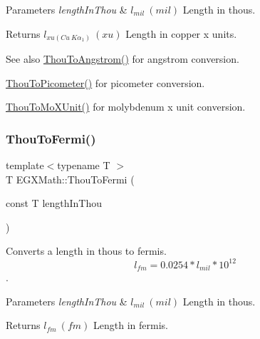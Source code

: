 \begin{DoxyParams}{Parameters}
{\em length\+In\+Thou} & $ l_{mil}\ (mil)$ Length in thous. \\
\hline
\end{DoxyParams}
\begin{DoxyReturn}{Returns}
$ l_{xu(Cu\ K\alpha_1)}\ (xu)$ Length in copper x units. 
\end{DoxyReturn}
\begin{DoxySeeAlso}{See also}
\mbox{\hyperlink{group___e_g_x_math-_conversions-_length_conversions-_imperial-_thou-_non-_s_i_ga5d852bdec8556e4b6bde1445f5f74a20}{Thou\+To\+Angstrom()}} for angstrom conversion. 

\mbox{\hyperlink{group___e_g_x_math-_conversions-_length_conversions-_imperial-_thou-_s_i_gabc7a92b07f617bdf0ac0249d34c4aa4c}{Thou\+To\+Picometer()}} for picometer conversion. 

\mbox{\hyperlink{group___e_g_x_math-_conversions-_length_conversions-_imperial-_thou-_non-_s_i_ga3eb765800fa51e529878bdae4e997763}{Thou\+To\+Mo\+X\+Unit()}} for molybdenum x unit conversion. 
\end{DoxySeeAlso}
\mbox{\label{group___e_g_x_math-_conversions-_length_conversions-_imperial-_thou-_non-_s_i_ga4a134cf9b956cd51e579dc65b4fd7774}} 
\subsubsection{\texorpdfstring{Thou\+To\+Fermi()}{ThouToFermi()}}
{\footnotesize\ttfamily template$<$typename T $>$ \\
T E\+G\+X\+Math\+::\+Thou\+To\+Fermi (\begin{DoxyParamCaption}\item[{const T}]{length\+In\+Thou }\end{DoxyParamCaption})}



Converts a length in thous to fermis. \[ l_{fm}=0.0254 * l_{mil} * 10^{12} \]. 


\begin{DoxyParams}{Parameters}
{\em length\+In\+Thou} & $ l_{mil}\ (mil)$ Length in thous. \\
\hline
\end{DoxyParams}
\begin{DoxyReturn}{Returns}
$ l_{fm}\ (fm)$ Length in fermis. 
\end{DoxyReturn}
\mbox{\label{group___e_g_x_math-_conversions-_length_conversions-_imperial-_thou-_non-_s_i_ga7f43c9a1cbb845911bdcbbbe388347a1}} 
